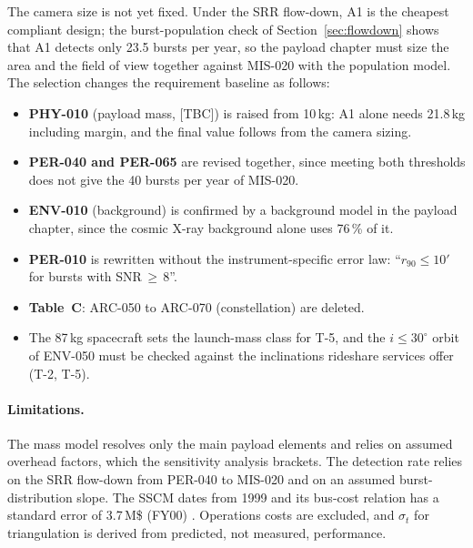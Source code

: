 The camera size is not yet fixed. Under the SRR flow-down, A1 is the cheapest compliant design;
the burst-population check of Section~\ref{sec:flowdown} shows that A1 detects only 23.5
bursts per year, so the payload chapter must size the area and the field of view together
against MIS-020 with the population model. The selection changes the requirement baseline as
follows:
\begin{itemize}
\item \textbf{PHY-010} (payload mass, [TBC]) is raised from 10\,kg: A1 alone needs 21.8\,kg
including margin, and the final value follows from the camera sizing.
\item \textbf{PER-040 and PER-065} are revised together, since meeting both thresholds does not
give the 40 bursts per year of MIS-020.
\item \textbf{ENV-010} (background) is confirmed by a background model in the payload chapter,
since the cosmic X-ray background alone uses 76\,\% of it.
\item \textbf{PER-010} is rewritten without the instrument-specific error law: ``$r_{90}\le10'$
for bursts with SNR\,$\ge$\,8''.
\item \textbf{Table~C}: ARC-050 to ARC-070 (constellation) are deleted.
\item The 87\,kg spacecraft sets the launch-mass class for T-5, and the $i\le30^\circ$ orbit
of ENV-050 must be checked against the inclinations rideshare services offer (T-2, T-5).
\end{itemize}

\paragraph{Limitations.} The mass model resolves only the main payload elements and relies on
assumed overhead factors, which the sensitivity analysis brackets. The detection rate relies on
the SRR flow-down from PER-040 to MIS-020 and on an assumed burst-distribution slope. The SSCM
dates from 1999 and its bus-cost relation has a standard error of 3.7\,M\$ (FY00)
\cite[p.~797]{Wertz1999}. Operations costs are excluded, and $\sigma_t$ for triangulation is
derived from predicted, not measured, performance.
